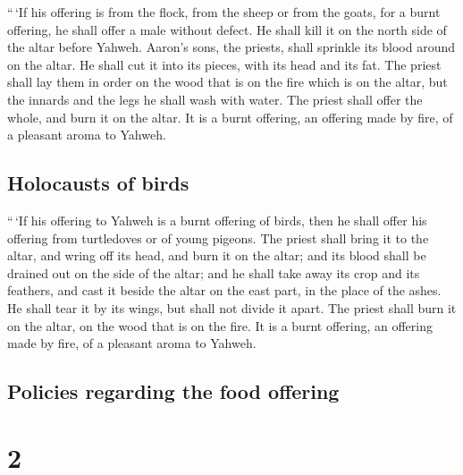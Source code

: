 ``\,`If his offering is from the flock, from the sheep
or from the goats, for a burnt offering, he shall offer a male without
defect.  He shall kill it on the north side of the altar
before Yahweh. Aaron's sons, the priests, shall sprinkle its blood
around on the altar.  He shall cut it into its pieces,
with its head and its fat. The priest shall lay them in order on the
wood that is on the fire which is on the altar,  but the
innards and the legs he shall wash with water. The priest shall offer
the whole, and burn it on the altar. It is a burnt offering, an offering
made by fire, of a pleasant aroma to Yahweh.

\hypertarget{holocausts-of-birds}{%
\subsection{Holocausts of birds}\label{holocausts-of-birds}}

 ``\,`If his offering to Yahweh is a burnt offering of
birds, then he shall offer his offering from turtledoves or of young
pigeons.  The priest shall bring it to the altar, and
wring off its head, and burn it on the altar; and its blood shall be
drained out on the side of the altar;  and he shall take
away its crop and its feathers, and cast it beside the altar on the east
part, in the place of the ashes.  He shall tear it by its
wings, but shall not divide it apart. The priest shall burn it on the
altar, on the wood that is on the fire. It is a burnt offering, an
offering made by fire, of a pleasant aroma to Yahweh.

\hypertarget{policies-regarding-the-food-offering}{%
\subsection{Policies regarding the food
offering}\label{policies-regarding-the-food-offering}}

\hypertarget{section-1}{%
\section{2}\label{section-1}}

